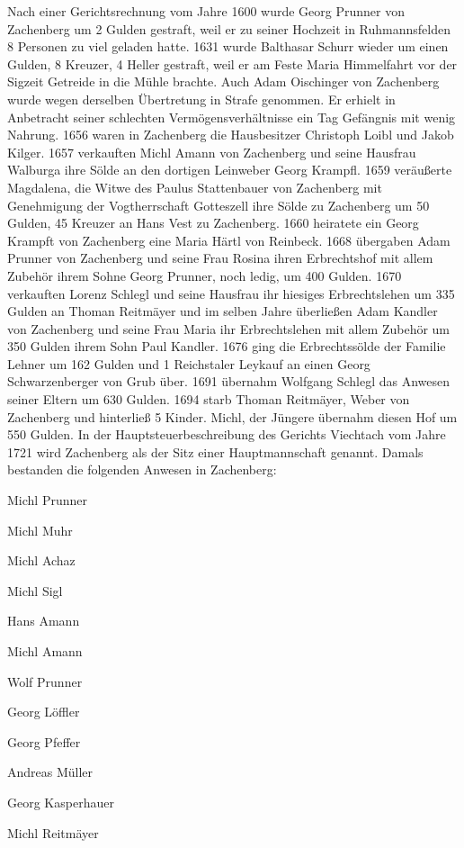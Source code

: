 \documentclass[12pt,a4pager]{book}
\begin{document}
Nach einer Gerichtsrechnung vom Jahre 1600 wurde Georg Prunner von Zachenberg um
2 Gulden gestraft, weil er zu seiner Hochzeit in Ruhmannsfelden 8 Personen zu
viel geladen hatte. 1631 wurde Balthasar Schurr wieder um einen Gulden, 8
Kreuzer, 4 Heller gestraft, weil er am Feste Maria Himmelfahrt vor der Sigzeit
Getreide in die Mühle brachte. Auch Adam Oischinger von Zachenberg wurde wegen
derselben Übertretung in Strafe genommen. Er erhielt in Anbetracht seiner
schlechten Vermögensverhältnisse ein Tag Gefängnis mit wenig Nahrung. 1656 waren
in Zachenberg die Hausbesitzer Christoph Loibl und Jakob Kilger. 1657 verkauften
Michl Amann von Zachenberg und seine Hausfrau Walburga ihre Sölde an den
dortigen Leinweber Georg Krampfl. 1659 veräußerte Magdalena, die Witwe des
Paulus Stattenbauer von Zachenberg mit Genehmigung der Vogtherrschaft Gotteszell
ihre Sölde zu Zachenberg um 50 Gulden, 45 Kreuzer an Hans Vest zu Zachenberg.
1660 heiratete ein Georg Krampft von Zachenberg eine Maria Härtl von Reinbeck.
1668 übergaben Adam Prunner von Zachenberg und seine Frau Rosina ihren
Erbrechtshof mit allem Zubehör ihrem Sohne Georg Prunner, noch ledig, um 400
Gulden. 1670 verkauften Lorenz Schlegl und seine Hausfrau ihr hiesiges
Erbrechtslehen um 335 Gulden an Thoman Reitmäyer und im selben Jahre überließen
Adam Kandler von Zachenberg und seine Frau Maria ihr Erbrechtslehen mit allem
Zubehör um 350 Gulden ihrem Sohn Paul Kandler. 1676 ging die Erbrechtssölde der
Familie Lehner um 162 Gulden und 1 Reichstaler Leykauf an einen Georg
Schwarzenberger von Grub über. 1691 übernahm Wolfgang Schlegl das Anwesen seiner
Eltern um 630 Gulden. 1694 starb Thoman Reitmäyer, Weber von Zachenberg und
hinterließ 5 Kinder. Michl, der Jüngere übernahm diesen Hof um 550 Gulden. In
der Hauptsteuerbeschreibung des Gerichts Viechtach vom Jahre 1721 wird
Zachenberg als der Sitz einer Hauptmannschaft genannt. Damals bestanden die
folgenden Anwesen in Zachenberg:

Michl Prunner

Michl Muhr

Michl Achaz

Michl Sigl

Hans Amann

Michl Amann

Wolf Prunner

Georg Löffler

Georg Pfeffer

Andreas Müller

Georg Kasperhauer

Michl Reitmäyer
\end{document}

